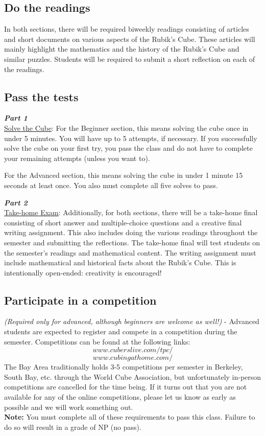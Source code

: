 \documentclass[11pt]{article}
\begin{document}
\subsection*{Do the readings}
In both sections, there will be required biweekly readings consisting of articles and short documents on various aspects of the Rubik’s Cube.  These articles will mainly highlight the mathematics and the history of the Rubik’s Cube and similar puzzles.  Students will be required to submit a short reflection on each of the readings.

\subsection*{Pass the tests}
\hspace{\parindent} \textit{\textbf{Part 1}} \\
\underline{Solve the Cube}: For the Beginner section, this means solving the cube once in under 5 minutes. You will have up to 5 attempts, if necessary. If you successfully solve the cube on your first try, you pass the class and do not have to complete your remaining attempts (unless you want to).

For the Advanced section, this means solving the cube in under 1 minute 15 seconds at least once. You also must complete all five solves to pass.

\textit{\textbf{Part 2}} \\
\underline{Take-home Exam}: Additionally, for both sections, there will be a take-home final consisting of short answer and multiple-choice questions and a creative final writing assignment. This also includes doing the various readings throughout the semester and submitting the reflections.
The take-home final will test students on the semester’s readings and mathematical content.
The writing assignment must include mathematical and historical facts about the Rubik's Cube. This is intentionally open-ended: creativity is encouraged!


\subsection*{Participate in a competition}
\textit{(Required only for advanced, although beginners are welcome as well!)} - Advanced students are expected to register and compete in a competition during the semester. Competitions can be found at the following links:
\[www.cuberslive.com/tpc/\]
\[www.cubingathome.com/\]
The Bay Area traditionally holds 3-5 competitions per semester in Berkeley, South Bay, etc. through the World Cube Association, but unfortunately in-person competitions are cancelled for the time being. If it turns out that you are not available for any of the online competitions, please let us know as early as possible and we will work something out.\\
\textbf{Note:} You must complete all of these requirements to pass this class. Failure to do so will result in a grade of NP (no pass).
\end{document}
